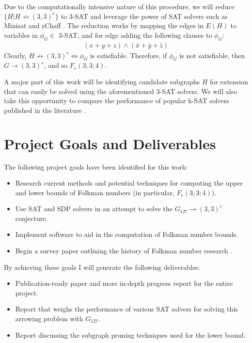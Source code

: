\documentclass[paper=a4, fontsize=11pt]{scrartcl} %
\begin{document}
Due to the computationally intensive nature of this procedure, we will 
reduce $\{H | H \not \to (3,3)^e\}$ to 3-SAT and leverage
the power of SAT solvers such as Minisat \cite{minisat} and zChaff \cite{zchaff}. The reduction works by
mapping the edges in $E(H)$ to variables in $\phi_G \in$ 3-SAT, and for edge adding the following
clauses to $\phi_G$:
\begin{align*}
(x + y + z) \wedge (\bar{x} + \bar{y} + \bar{z})
\end{align*}
Clearly, $H \not \to (3,3)^e \Leftrightarrow \phi_G$ is satisfiable. Therefore, if $\phi_G$ is not satisfiable,
then $G \to (3,3)^e$, and so $F_e(3,3;4)$.

A major part of this work will be identifying candidate subgraphs $H$ for extension that 
can easily be solved using the aforementioned 3-SAT solvers. We will also take this opportunity
to compare the performance of popular k-SAT solvers published in the literature \cite{zchaff} \cite{minisat}.

\section{Project Goals and Deliverables}
The following project goals have been identified for this work:
\begin{itemize}
	\item Research current methods and potential techniques for computing the upper and lower bounds of Folkman 
	numbers (in particular, $F_e(3,3;4)$).
	\item Use SAT and SDP solvers in an attempt to solve the $G_{127} \to (3,3)^e$ conjecture.
	\item Implement software to aid in the computation of Folkman number bounds.
	\item Begin a survey paper outlining the history of Folkman number research \cite{sprSurvey}.
\end{itemize}

By achieving these goals I will generate the following deliverables:
\begin{itemize}
	\item Publication-ready paper and more in-depth progress report for the entire project.
	\item Report that weighs the performance of various SAT solvers for solving this arrowing problem with $G_{127}$.
	\item Report discussing the subgraph pruning techniques used for the lower bound.
\end{itemize}
\end{document}
